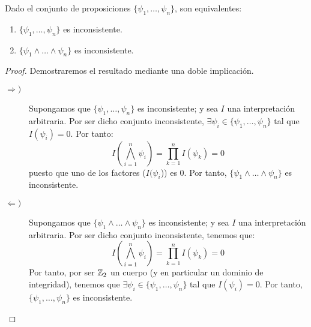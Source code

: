 \begin{prop}\label{prop:ej1}
        Dado el conjunto de proposiciones $\{\psi_1, \ldots, \psi_n\}$, son equivalentes:
        \begin{enumerate}
            \item $\{\psi_1, \ldots, \psi_n\}$ es inconsistente.
            \item $\{\psi_1 \land \ldots \land \psi_n\}$ es inconsistente.
        \end{enumerate}
        \begin{proof}
            Demostraremos el resultado mediante una doble implicación.
            \begin{description}
                \item[$\Longrightarrow)$]  Supongamos que $\{\psi_1, \ldots, \psi_n\}$ es inconsistente; y sea $I$ una interpretación arbitraria. Por ser dicho conjunto inconsistente, $\exists \psi_i \in \{\psi_1, \ldots, \psi_n\}$ tal que $I(\psi_i) = 0$. Por tanto:
                \begin{equation*}
                    I\left(\bigwedge_{i=1}^n \psi_i\right) = \prod_{k=1}^n I(\psi_k) = 0
                \end{equation*}
                puesto que uno de los factores ($I(\psi_i$)) es $0$. Por tanto, $\{\psi_1 \land \ldots \land \psi_n\}$ es inconsistente.

                \item[$\Longleftarrow)$] Supongamos que $\{\psi_1 \land \ldots \land \psi_n\}$ es inconsistente; y sea $I$ una interpretación arbitraria. Por ser dicho conjunto inconsistente, tenemos que:
                \begin{equation*}
                    I\left(\bigwedge_{i=1}^n \psi_i\right) = \prod_{k=1}^n I(\psi_k) = 0
                \end{equation*}
                Por tanto, por ser $\mathbb{Z}_2$ un cuerpo (y en particular un dominio de integridad), tenemos que $\exists \psi_i \in \{\psi_1, \ldots, \psi_n\}$ tal que $I(\psi_i) = 0$. Por tanto, $\{\psi_1, \ldots, \psi_n\}$ es inconsistente.
            \end{description}
        \end{proof}
    \end{prop}



